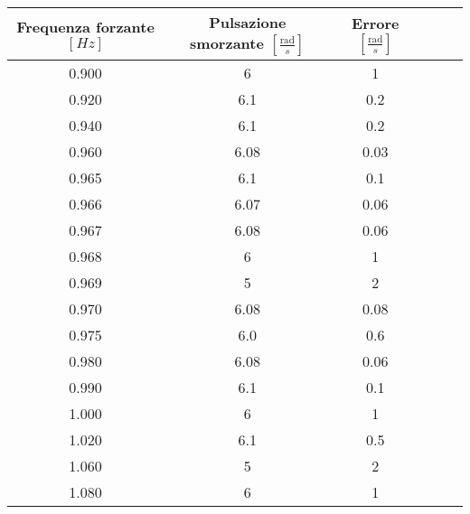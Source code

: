 \begin{tabular}{cccccc}
\toprule
Frequenza forzante $[Hz]$  & Pulsazione smorzante $\left[\frac{\mathrm{rad}}{s}\right]$ & Errore $\left[\frac{\mathrm{rad}}{s}\right]$\\ \midrule
0.900 & 6 & 1\\ \midrule
0.920 & 6.1 & 0.2\\ \midrule
0.940 & 6.1 & 0.2\\ \midrule
0.960 & 6.08 & 0.03\\ \midrule
0.965 & 6.1 & 0.1\\ \midrule
0.966 & 6.07 & 0.06\\ \midrule
0.967 & 6.08 & 0.06\\ \midrule
0.968 & 6 & 1\\ \midrule
0.969 & 5 & 2\\ \midrule
0.970 & 6.08 & 0.08\\ \midrule
0.975 & 6.0 & 0.6\\ \midrule
0.980 & 6.08 & 0.06\\ \midrule
0.990 & 6.1 & 0.1\\ \midrule
1.000 & 6 & 1\\ \midrule
1.020 & 6.1 & 0.5\\ \midrule
1.060 & 5 & 2\\ \midrule
1.080 & 6 & 1\\ \bottomrule
\end{tabular}
